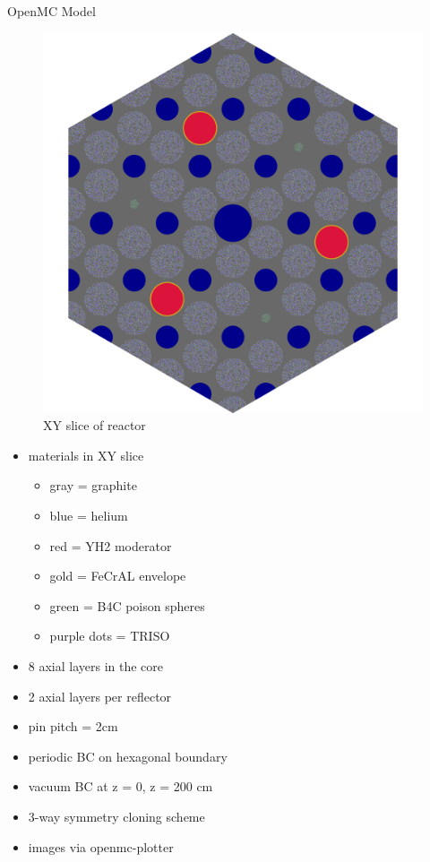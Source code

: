 \documentclass[9pt,t,aspectratio=169]{beamer}
\begin{document}
\begin{frame}{OpenMC Model}
\begin{minipage}[t]{0.365\linewidth}
\begin{figure}
            \includegraphics[height=0.7\textheight]{figures/gcmr_slice.png}
            \caption{XY slice of reactor}
        \end{figure}
    \end{minipage}
    \hfill%
    \begin{minipage}[t]{0.385\linewidth}
        \begin{itemize}
        \item<4-> materials in XY slice
        \begin{itemize}
            \item<5-> gray = graphite
            \item<6-> blue = helium
            \item<7-> red = YH2 moderator
            \item<8-> gold = FeCrAL envelope
            \item<9-> green = B4C poison spheres
            \item<10-> purple dots = TRISO
        \end{itemize}
        \item<11-> 8 axial layers in the core
        \item<12-> 2 axial layers per reflector
        \item<13-> pin pitch = 2cm
        \item<14-> periodic BC on hexagonal boundary
        \item<15-> vacuum BC at z = 0, z = 200 cm
        \item<16-> 3-way symmetry cloning scheme
        \item<17-> images via openmc-plotter
        \end{itemize}
    \end{minipage}
\end{frame}
\end{document}
